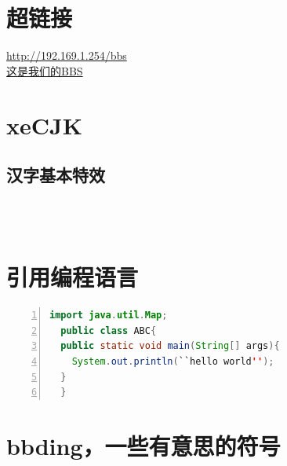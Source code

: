 \documentclass[a4paper,12pt]{article} %
\begin{document}
\section{超链接}
\url{http://192.169.1.254/bbs}\\
\href{http://192.169.1.254/bbs}{这是我们的BBS}


\section{xeCJK}
\subsection{汉字基本特效}
\\
\\


\section{引用编程语言}
\begin{lstlisting}[language=Java,firstline=2,lastline=5,numbers=left,numberstyle=\large,stepnumber=2,numbersep=10pt]
  import java.util.Map;
  public class ABC{
  public static void main(String[] args){
    System.out.println(``hello world'');
  }
  }
\end{lstlisting}
  
\section{bbding，一些有意思的符号}
\begin{Huge}
\HandRight \HandLeft \XSolid \Plus \Cross \CrossClowerTips \\
\CrossMaltese \FiveStar \FiveStarLines \SixStar \EightStar \TwelweStar \\
\SixteenStarLight \FiveFlowerOpen \FiveFlowerPetal \Snowflake \SnowflakeChevron \Sparkle \\
\SquareSolid \Square \TriangleUp \TriangleDown \OrnamentDiamondSolid \Ellipse \\
\Phone \Tape \Plane \Envelope \Peace \Checkmark \\
\end{Huge}
\end{document}
